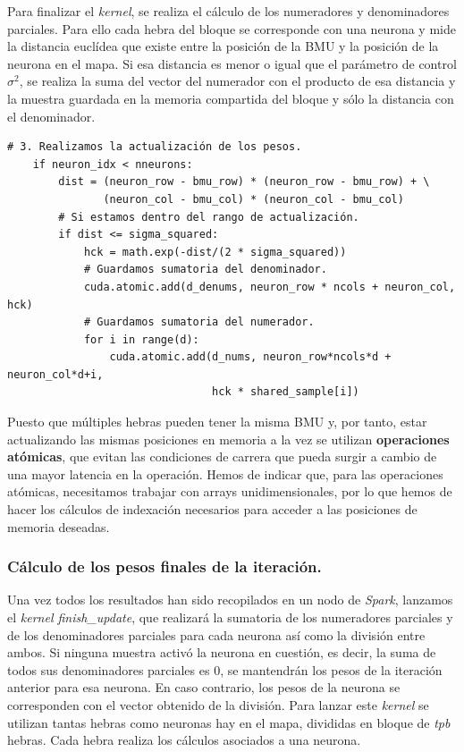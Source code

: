 Para finalizar el \textit{kernel}, se realiza el cálculo de los numeradores y denominadores parciales. Para ello cada hebra del bloque se corresponde con una neurona y mide la distancia euclídea que existe entre la posición de la BMU y la posición de la neurona en el mapa. Si esa distancia es menor o igual que el parámetro de control $\sigma^2$, se realiza la suma del vector del numerador con el producto de esa distancia y la muestra guardada en la memoria compartida del bloque y sólo la distancia con el denominador. \\
\begin{code}
\begin{verbatim}
# 3. Realizamos la actualización de los pesos.
    if neuron_idx < nneurons:
        dist = (neuron_row - bmu_row) * (neuron_row - bmu_row) + \
               (neuron_col - bmu_col) * (neuron_col - bmu_col)
        # Si estamos dentro del rango de actualización.
        if dist <= sigma_squared:
            hck = math.exp(-dist/(2 * sigma_squared))
            # Guardamos sumatoria del denominador.
            cuda.atomic.add(d_denums, neuron_row * ncols + neuron_col, hck)
            # Guardamos sumatoria del numerador.
            for i in range(d):
                cuda.atomic.add(d_nums, neuron_row*ncols*d + neuron_col*d+i,
                                hck * shared_sample[i])
\end{verbatim}
\label{code:somiter3}
\end{code}


Puesto que múltiples hebras pueden tener la misma BMU y, por tanto, estar actualizando las mismas posiciones en memoria a la vez se utilizan \textbf{operaciones atómicas}, que evitan las condiciones de carrera que pueda surgir a cambio de una mayor latencia en la operación. Hemos de indicar que, para las operaciones atómicas, necesitamos trabajar con arrays unidimensionales, por lo que hemos de hacer los cálculos de indexación necesarios para acceder a las posiciones de memoria deseadas.

\subsubsection{Cálculo de los pesos finales de la iteración.}
Una vez todos los resultados han sido recopilados en un nodo de \textit{Spark}, lanzamos el \textit{kernel finish\_update}, que realizará la sumatoria de los numeradores parciales y de los denominadores parciales para cada neurona así como la división entre ambos. Si ninguna muestra activó la neurona en cuestión, es decir, la suma de todos sus denominadores parciales es 0, se mantendrán los pesos de la iteración anterior para esa neurona. En caso contrario,  los pesos de la neurona se corresponden con el vector obtenido de la división. Para lanzar este \textit{kernel} se utilizan tantas hebras como neuronas hay en el mapa, divididas en bloque de \textit{tpb} hebras. Cada hebra realiza los cálculos asociados a una neurona.


